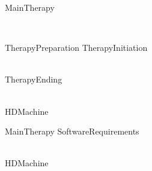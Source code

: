 \begin{circus}
	MainTherapy \circdef \\
	\begin{block}
		\\
		\begin{block}
			TherapyPreparation \circseq TherapyInitiation
		\end{block}\\
		 \circseq TherapyEnding
	\end{block}\\
	
	HDMachine \circdef \\
	\begin{block}
		MainTherapy \interleave SoftwareRequirements
	\end{block}\\
	
	\circspot HDMachine
\circend
\\
\end{circus}
